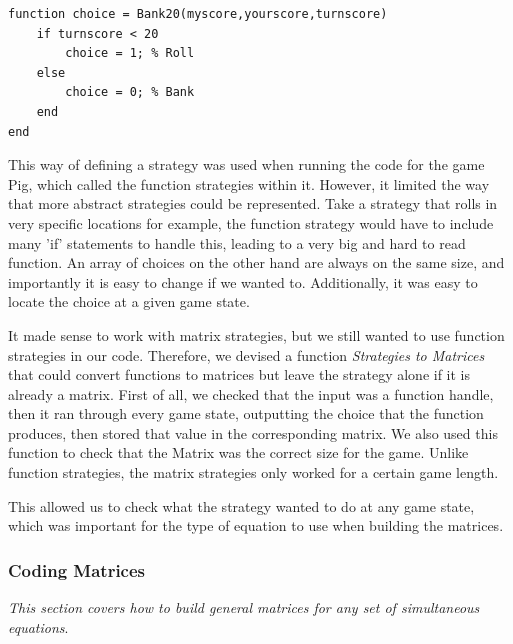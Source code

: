 \documentclass[a4paper,titlepage]{article}
\begin{document}
\begin{lstlisting}
function choice = Bank20(myscore,yourscore,turnscore)
	if turnscore < 20
		choice = 1; % Roll
	else
		choice = 0; % Bank
	end
end
\end{lstlisting}\label{bank20}

This way of defining a strategy was used when running the code for the game Pig, which called the function strategies within it. However, it limited the way that more abstract strategies could be represented. Take a strategy that rolls in very specific locations for example, the function strategy would have to include many 'if' statements to handle this, leading to a very big and hard to read function. An array of choices on the other hand are always on the same size, and importantly it is easy to change if we wanted to. Additionally, it was easy to locate the choice at a given game state.

It made sense to work with matrix strategies, but we still wanted to use function strategies in our code. Therefore, we devised a function \textit{Strategies to Matrices} that could convert functions to matrices but leave the strategy alone if it is already a matrix. First of all, we checked that the input was a function handle, then it ran through every game state, outputting the choice that the function produces, then stored that value in the corresponding matrix. We also used this function to check that the Matrix was the correct size for the game. Unlike function strategies, the matrix strategies only worked for a certain game length.


This allowed us to check what the strategy wanted to do at any game state, which was important for the type of equation to use when building the matrices.

\subsubsection{Coding Matrices}

\textit{This section covers how to build general matrices for any set of simultaneous equations}.
\end{document}
